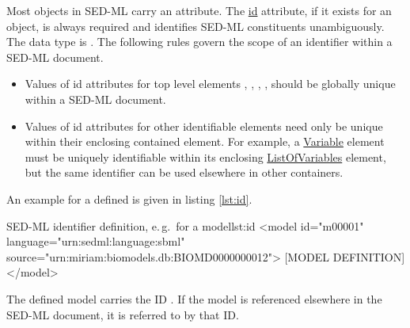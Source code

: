 \label{sec:id}
%

Most objects in SED-ML carry an  attribute. 
The \hyperref[sec:id]{id} attribute, if it exists for an object, is always required and identifies SED-ML constituents unambiguously.   
The  data type is . The following rules govern the scope of an identifier within a SED-ML document.
\begin{itemize}
\item Values of  id attributes for top level elements  , , , ,   should be globally unique within a SED-ML document. 
\item Values of id attributes for other identifiable elements need only be unique within their enclosing contained element. For example, a
 \hyperref[class:variable]{Variable} element must be uniquely identifiable within its enclosing  \hyperref[sec:listOfVariables] {ListOfVariables} element, but the same identifier can be used elsewhere in other containers.
\end{itemize}
An example for a defined  is given in listing \ref{lst:id}.
%
\begin{myXmlLst}{SED-ML identifier definition, e.\,g.\ for a model}{lst:id}
<model id="m00001" language="urn:sedml:language:sbml" source="urn:miriam:biomodels.db:BIOMD0000000012">
 [MODEL DEFINITION]
</model>
\end{myXmlLst}
%
The defined model carries the ID . If the model is referenced elsewhere in the SED-ML document, it is referred to by that ID.

